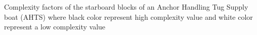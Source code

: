 Complexity factors of the starboard blocks of an Anchor Handling Tug Supply boat (AHTS) where black color represent high complexity value and white color represent a low complexity value